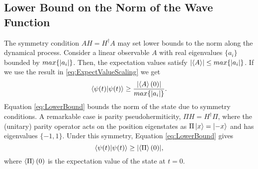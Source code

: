 \subsection{Lower Bound on the Norm of the Wave Function}%
%
%
The symmetry condition $AH = H^\dagger A$ may set lower bounds to the norm along the dynamical process.
Consider a linear observable $A$ with real eigenvalues $\{a_i\}$ bounded by ${max\{\abs{a_i}\}}$.
Then, the expectation values satisfy $\abs{\ev{A}}\leq max\{\abs{a_i}\}$. If we use the result in \eqref{eq:ExpectValueScaling} we get
%
\begin{equation}
  \braket{\psi(t)} \geq \frac{\abs{\ev{A}(0)}}{max\{\abs{a_i}\}}.
  \label{eq:LowerBound}
\end{equation}
%
Equation \eqref{eq:LowerBound} bounds the norm of the state due to symmetry conditions.
A remarkable case is parity pseudohermiticity, $\Pi H = H^\dagger \Pi$, where the (unitary)
parity operator acts on the position eigenstates as $\Pi\ket{x} = \ket{-x}$ and has eigenvalues $\{-1,1\}$. Under this symmetry, Equation \eqref{eq:LowerBound} gives
%
\begin{equation}
  \braket{\psi(t)} \geq \abs{\ev{\Pi}(0)},
  \label{eq:LowerBoundParity}
\end{equation}
%
where $\ev{\Pi}(0)$ is the expectation value of the state at $t=0$.
%
%
%
